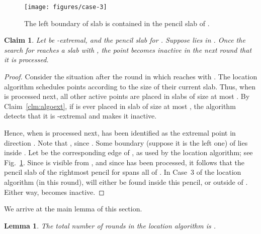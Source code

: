 \documentclass[letterpaper,11pt]{article}
\newtheorem{lemma}[theorem]{Lemma}
\newtheorem{claim}[theorem]{Claim}
\begin{document}
\begin{figure}
  \centering
  \texttt{[image: figures/case-3]}
  \caption{The left boundary of slab  is 
    contained in the pencil slab of .}
  \label{fig:case-3}
\end{figure}

\begin{claim}\label{clm:algo-inact} 
  Let  be 
  -extremal, and 
   the pencil slab for .
  Suppose  lies in 
  . Once
  the search for  reaches 
  a slab  with ,
  the point  becomes inactive  
  in the next round that it is 
  processed.
\end{claim}

\begin{proof} 
Consider the situation after 
the round in which  reaches  
with . 
The location algorithm schedules 
points according to the size 
of their current slab. 
Thus, when  is processed next, 
all other active points are placed 
in slabs of size at most . 
By Claim~\ref{clm:algoext},
if  is ever placed in slab of size 
at most , the algorithm
detects that it is -extremal 
and makes it inactive.

Hence, when  is processed next, 
 has been identified
as the extremal point in direction
. Note that ,
since . Some 
boundary (suppose it is the left one) of 
lies inside . Let  be the 
corresponding edge of , as used by 
the location algorithm; see Fig.~\ref{fig:case-3}.
Since  is visible from , 
and since  has been processed,
it follows that the pencil 
slab of the rightmost pencil 
for  spans all of .
In Case~3 of the location algorithm 
(in this round), 
will either be found inside this 
pencil, or outside of .
Either way,  becomes inactive.
\end{proof}

We arrive at the main lemma of this section.

\begin{lemma}\label{lem:algoCH} 
  The total number of rounds in 
  the location algorithm is 
  .
\end{lemma}
\end{document}

